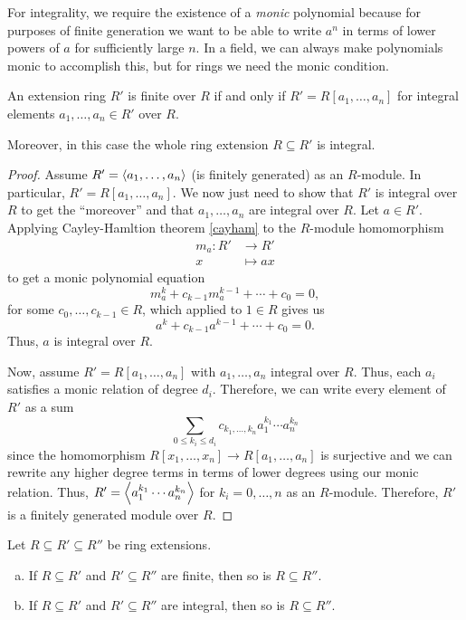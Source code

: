 \documentclass[12pt]{article}
\begin{document}
\begin{rmk}
    For integrality, we require the existence of a \textit{monic} polynomial because for purposes of finite generation we want to be able to write $a^n$ in terms of lower powers of $a$ for sufficiently large $n$. In a field, we can always make polynomials monic to accomplish this, but for rings we need the monic condition.
\end{rmk}

\begin{prop}\label{integral}
    An extension ring $R'$ is finite over $R$ if and only if $R'=R[a_1,\dots,a_n]$ for integral elements $a_1,\dots, a_n\in R'$ over $R$.
    
    Moreover, in this case the whole ring extension $R\subseteq R'$ is integral.
\end{prop}

\begin{proof}
    Assume $R' = \left\langle a_1,\dots,a_n\right\rangle$ (is finitely generated) as an $R$-module. In particular, $R'=R[a_1,\dots,a_n]$. We now just need to show that $R'$ is integral over $R$ to get the ``moreover'' and that $a_1,\dots,a_n$ are integral over $R$. Let $a\in R'$. Applying Cayley-Hamltion theorem \ref{cayham} to the $R$-module homomorphism
    \begin{align*}
        m_a: R' &\longrightarrow R'\\
        x &\longmapsto ax
    \end{align*}
    to get a monic polynomial equation
    \[m_a^k + c_{k-1} m_a^{k-1} + \cdots + c_0 = 0,\]
    for some $c_0,\dots,c_{k-1}\in R$, which applied to $1\in R$ gives us
    \[a^k + c_{k-1} a^{k-1} + \cdots + c_0 = 0.\]
    Thus, $a$ is integral over $R$.
    
    Now, assume $R' = R[a_1,\dots,a_n]$ with $a_1,\dots,a_n$ integral over $R$. Thus, each $a_i$ satisfies a monic relation of degree $d_i$. Therefore, we can write every element of $R'$ as a sum
    \[\sum_{0\leq k_i \leq d_i} c_{k_1,\dots,k_n} a_1^{k_1}\cdots a_n^{k_n}\]
    since the homomorphism $R[x_1,\dots,x_n]\to R[a_1,\dots,a_n]$ is surjective and we can rewrite any higher degree terms in terms of lower degrees using our monic relation. Thus, $R'=\left\langle a_1^{k_1}\cdots a_n^{k_n}\right\rangle$ for $k_i=0,\dots,n$ as an $R$-module. Therefore, $R'$ is a finitely generated module over $R$.
\end{proof}

\begin{lem}\label{transint}
    Let $R\subseteq R' \subseteq R''$ be ring extensions.
    \begin{enumerate}[(a)]
        \item If $R\subseteq R'$ and $R'\subseteq R''$ are finite, then so is $R\subseteq R''$.
        \item If $R\subseteq R'$ and $R'\subseteq R''$ are integral, then so is $R\subseteq R''$.
    \end{enumerate}
\end{lem}
\end{document}

